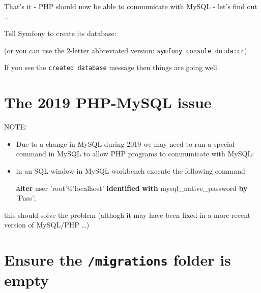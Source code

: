\documentclass[a4paperpaper,openright]{book}
\newenvironment{Shaded}{}{}
\newcommand{\ExtensionTok}[1]{#1}
\newcommand{\FunctionTok}[1]{\textcolor[rgb]{0.02,0.16,0.49}{#1}}
\newcommand{\KeywordTok}[1]{\textcolor[rgb]{0.00,0.44,0.13}{\textbf{#1}}}
\newcommand{\NormalTok}[1]{#1}
\newcommand{\StringTok}[1]{\textcolor[rgb]{0.25,0.44,0.63}{#1}}
\begin{document}
That's it - PHP should now be able to communicate with MySQL - let's
find out \ldots{}

Tell Symfony to create its database:

\begin{Shaded}
\end{Shaded}

(or you can use the 2-letter abbreviated version:
\texttt{symfony\ console\ do:da:cr})

If you see the \texttt{created\ database} message then things are going
well.

\hypertarget{the-2019-php-mysql-issue}{%
\section{The 2019 PHP-MySQL issue}\label{the-2019-php-mysql-issue}}

NOTE:

\begin{itemize}
\item
  Due to a change in MySQL during 2019 we may need to run a special
  command in MySQL to allow PHP programs to communicate with MySQL:
\item
  in an SQL window in MySQL workbench execute the following command

\begin{Shaded}
\begin{Highlighting}[]
  \KeywordTok{alter} \FunctionTok{user} \StringTok{'root'}\NormalTok{@}\StringTok{'localhost'} \KeywordTok{identified} \KeywordTok{with}\NormalTok{ mysql_native_password }\KeywordTok{by} \StringTok{'Pass$$'}\NormalTok{;}
\end{Highlighting}
\end{Shaded}
\end{itemize}

this should solve the problem (althogh it may have been fixed in a more
recent version of MySQL/PHP \ldots{})

\hypertarget{ensure-the-migrations-folder-is-empty}{%
\section{\texorpdfstring{Ensure the \texttt{/migrations} folder is
empty}{Ensure the /migrations folder is empty}}\label{ensure-the-migrations-folder-is-empty}}
\end{document}

